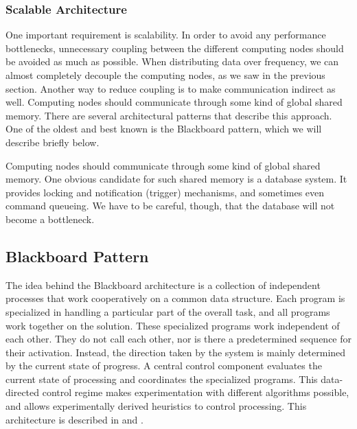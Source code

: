 \documentclass[10pt]{lofar}
\begin{document}
\subsubsection{Scalable Architecture}
\label{subsubsec:scalable-architecture}
One important requirement is scalability. In order to avoid any performance
bottlenecks, unnecessary coupling between the different computing nodes should
be avoided as much as possible. When distributing data over frequency, we can
almost completely decouple the computing nodes, as we saw in the previous
section. Another way to reduce coupling is to make communication indirect as
well. Computing nodes should communicate through some kind of global shared
memory. There are several architectural patterns that describe this
approach. One of the oldest and best known is the Blackboard pattern, which we
will describe briefly below.

Computing nodes should communicate through some kind of global shared
memory. One obvious candidate for such shared memory is a database system. It
provides locking and notification (trigger) mechanisms, and sometimes even
command queueing. We have to be careful, though, that the database will not
become a bottleneck.

\subsection{Blackboard Pattern}
\label{subsec:blackboard}
The idea behind the Blackboard architecture is a collection of independent
processes that work cooperatively on a common data structure. Each program is
specialized in handling a particular part of the overall task, and all
programs work together on the solution. These specialized programs work
independent of each other. They do not call each other, nor is there a
predetermined sequence for their activation. Instead, the direction taken by
the system is mainly determined by the current state of progress. A central
control component evaluates the current state of processing and coordinates
the specialized programs. This data-directed control regime makes
experimentation with different algorithms possible, and allows experimentally
derived heuristics to control processing. This architecture is described in
\cite{Buschmann1996} and \cite{LOFAR-ASTRON-SDD-002}.
\end{document}
